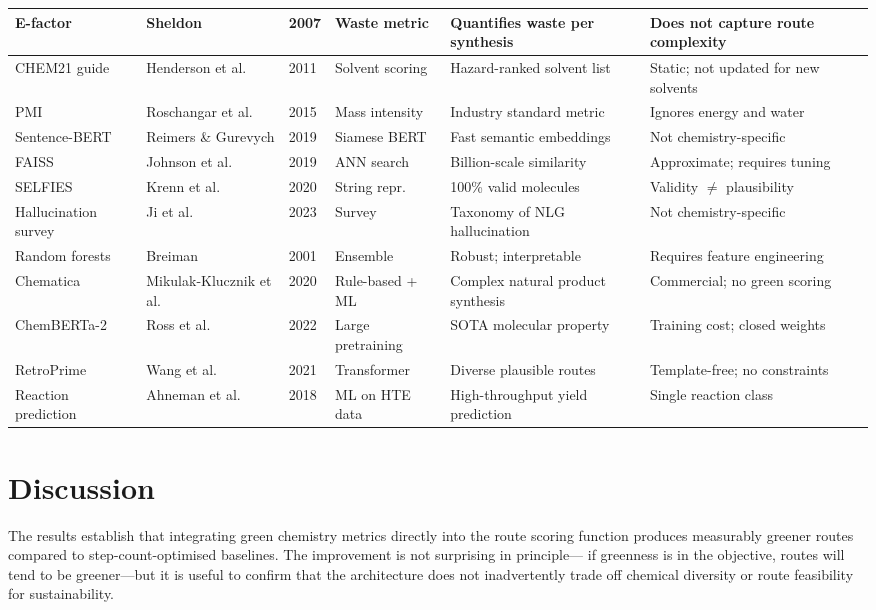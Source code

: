 \documentclass[12pt,a4paper]{article}
\begin{document}
\begin{longtable}{p{3.2cm}p{2.5cm}p{0.7cm}p{2.5cm}p{3.5cm}p{2.8cm}}
  \midrule
  E-factor & Sheldon & 2007 & Waste metric & Quantifies waste per synthesis & Does not capture route complexity \\
  \midrule
  CHEM21 guide & Henderson et al. & 2011 & Solvent scoring & Hazard-ranked solvent list & Static; not updated for new solvents \\
  \midrule
  PMI & Roschangar et al. & 2015 & Mass intensity & Industry standard metric & Ignores energy and water \\
  \midrule
  Sentence-BERT & Reimers \& Gurevych & 2019 & Siamese BERT & Fast semantic embeddings & Not chemistry-specific \\
  \midrule
  FAISS & Johnson et al. & 2019 & ANN search & Billion-scale similarity & Approximate; requires tuning \\
  \midrule
  SELFIES & Krenn et al. & 2020 & String repr. & 100\% valid molecules & Validity $\neq$ plausibility \\
  \midrule
  Hallucination survey & Ji et al. & 2023 & Survey & Taxonomy of NLG hallucination & Not chemistry-specific \\
  \midrule
  Random forests & Breiman & 2001 & Ensemble & Robust; interpretable & Requires feature engineering \\
  \midrule
  Chematica & Mikulak-Klucznik et al. & 2020 & Rule-based + ML & Complex natural product synthesis & Commercial; no green scoring \\
  \midrule
  ChemBERTa-2 & Ross et al. & 2022 & Large pretraining & SOTA molecular property & Training cost; closed weights \\
  \midrule
  RetroPrime & Wang et al. & 2021 & Transformer & Diverse plausible routes & Template-free; no constraints \\
  \midrule
  Reaction prediction & Ahneman et al. & 2018 & ML on HTE data & High-throughput yield prediction & Single reaction class \\
\end{longtable}

\section{Discussion}

The results establish that integrating green chemistry metrics directly into
the route scoring function produces measurably greener routes compared to
step-count-optimised baselines. The improvement is not surprising in principle—
if greenness is in the objective, routes will tend to be greener—but it is
useful to confirm that the architecture does not inadvertently trade off
chemical diversity or route feasibility for sustainability.
\end{document}
